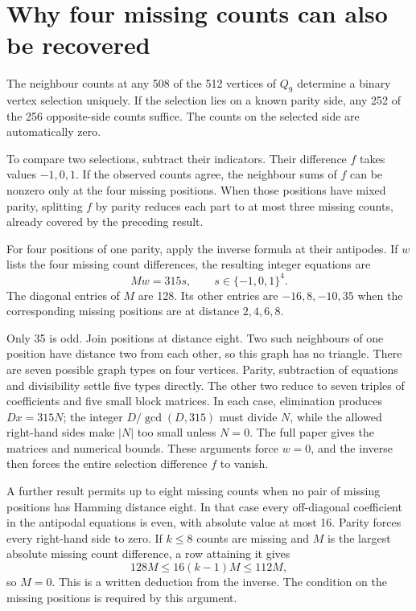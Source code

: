 \section{Why four missing counts can also be recovered}
The neighbour counts at any 508 of the 512 vertices of $Q_9$ determine
a binary vertex selection uniquely. If the selection lies on a known
parity side, any 252 of the 256 opposite-side counts suffice. The counts
on the selected side are automatically zero.

To compare two selections, subtract their indicators. Their difference
$f$ takes values $-1,0,1$. If the observed counts agree, the neighbour
sums of $f$ can be nonzero only at the four missing positions. When
those positions have mixed parity, splitting $f$ by parity reduces
each part to at most three missing counts, already covered by the
preceding result.

For four positions of one parity, apply the inverse formula at their
antipodes. If $w$ lists the four missing count differences, the resulting
integer equations are
\[
Mw=315s,\qquad s\in\{-1,0,1\}^4.
\]
The diagonal entries of $M$ are 128. Its other entries are $-16,8,-10,35$
when the corresponding missing positions are at distance $2,4,6,8$.

Only 35 is odd. Join positions at distance eight. Two such neighbours
of one position have distance two from each other, so this graph has
no triangle. There are seven possible graph types on four vertices.
Parity, subtraction of equations and divisibility settle five types
directly. The other two reduce to seven triples of coefficients and
five small block matrices. In each case, elimination produces
$Dx=315N$; the integer $D/\gcd(D,315)$ must divide $N$, while the allowed
right-hand sides make $|N|$ too small unless $N=0$. The full paper gives
the matrices and numerical bounds. These arguments force $w=0$, and
the inverse then forces the entire selection difference $f$ to vanish.

A further result permits up to eight missing counts when no pair of
missing positions has Hamming distance eight. In that case every
off-diagonal coefficient in the antipodal equations is even, with
absolute value at most 16. Parity forces every right-hand side to zero.
If $k\le8$ counts are missing and $M$ is the largest absolute missing
count difference, a row attaining it gives
\[
128M\le16(k-1)M\le112M,
\]
so $M=0$. This is a written deduction from the inverse. The condition
on the missing positions is required by this argument.

